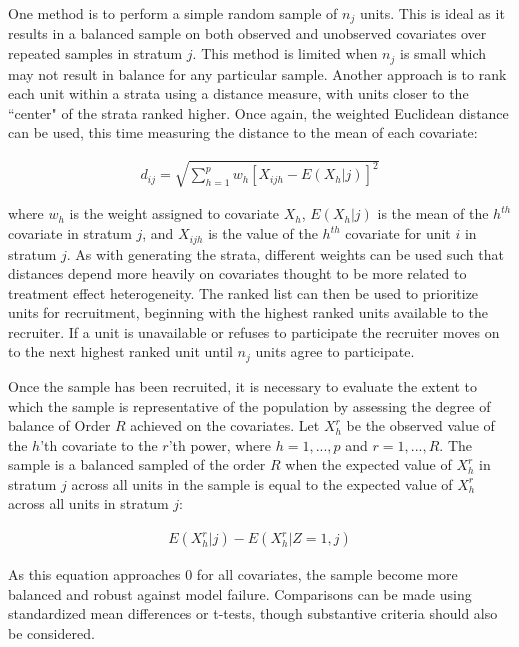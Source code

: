 \documentclass[man,floatsintext]{apa6}
\theoremstyle{definition}
\theoremstyle{definition}
\theoremstyle{definition}
\theoremstyle{remark}
\begin{document}
One method is to perform a simple random sample of \(n_j\) units. This
is ideal as it results in a balanced sample on both observed and
unobserved covariates over repeated samples in stratum \(j\). This
method is limited when \(n_j\) is small which may not result in balance
for any particular sample. Another approach is to rank each unit within
a strata using a distance measure, with units closer to the ``center" of
the strata ranked higher. Once again, the weighted Euclidean distance
can be used, this time measuring the distance to the mean of each
covariate:

\begin{align} \label{eq:euclid}
  d_{ij} = \sqrt{\sum^p_{h=1}w_h[X_{ijh} - E(X_h|j)]^2}
\end{align}

where \(w_h\) is the weight assigned to covariate \(X_h\), \(E(X_h|j)\)
is the mean of the \(h^{th}\) covariate in stratum \(j\), and
\(X_{ijh}\) is the value of the \(h^{th}\) covariate for unit \(i\) in
stratum \(j\). As with generating the strata, different weights can be
used such that distances depend more heavily on covariates thought to be
more related to treatment effect heterogeneity. The ranked list can then
be used to prioritize units for recruitment, beginning with the highest
ranked units available to the recruiter. If a unit is unavailable or
refuses to participate the recruiter moves on to the next highest ranked
unit until \(n_j\) units agree to participate.

Once the sample has been recruited, it is necessary to evaluate the
extent to which the sample is representative of the population by
assessing the degree of balance of Order \(R\) achieved on the
covariates. Let \(X^r_h\) be the observed value of the \(h\)'th
covariate to the \(r\)'th power, where \(h = {1, ..., p}\) and
\(r = {1, ..., R}\). The sample is a balanced sampled of the order \(R\)
when the expected value of \(X^r_h\) in stratum \(j\) across all units
in the sample is equal to the expected value of \(X^r_h\) across all
units in stratum \(j\):

\begin{align}
  E(X^r_h|j) - E(X^r_h|Z = 1, j)
\end{align}

As this equation approaches 0 for all covariates, the sample become more
balanced and robust against model failure. Comparisons can be made using
standardized mean differences or t-tests, though substantive criteria
should also be considered.
\end{document}
